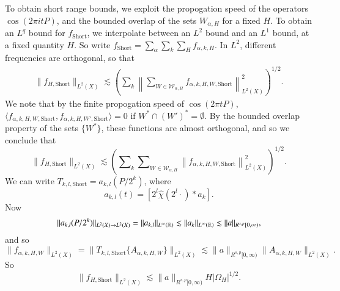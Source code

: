 To obtain short range bounds, we exploit the propogation speed of the operators $\cos(2 \pi i t P)$, and the bounded overlap of the sets $W_{\alpha,H}$ for a fixed $H$. To obtain an $L^q$ bound for $f_{\text{Short}}$, we interpolate between an $L^2$ bound and an $L^1$ bound, at a fixed quantity $H$. So write $f_{\text{Short}} = \sum_\alpha \sum_k \sum_H f_{\alpha,k,H}$.
%
In $L^2$, different frequencies are orthogonal, so that
%
\begin{equation}
\begin{split}
    \| f_{H,\text{Short}} \|_{L^2(X)} \lesssim \left( \sum\nolimits_k \left\| \sum\nolimits_{W \in \mathcal{W}_{\alpha,H}} f_{\alpha,k,H,W,\text{Short}} \right\|_{L^2(X)}^2 \right)^{1/2}.
\end{split}
\end{equation}
%
We note that by the finite propogation speed of $\cos(2 \pi t P)$, $\langle f_{\alpha,k,H,W,\text{Short}}, f_{\alpha,k,H,W',\text{Short}} \rangle = 0$ if $W^* \cap (W')^* = \emptyset$. By the bounded overlap property of the sets $\{ W^* \}$, these functions are almost orthogonal, and so we conclude that
%
\begin{equation}
    \| f_{H,\text{Short}} \|_{L^2(X)} \lesssim \left( \sum\nolimits_k \sum\nolimits_{W \in \mathcal{W}_{\alpha,H}} \left\| f_{\alpha,k,H,W,\text{Short}} \right\|_{L^2(X)}^2 \right)^{1/2}.
\end{equation}
%
We can write $T_{k,l,\text{Short}} = a_{k,l}(P / 2^k)$, where
%
\begin{equation}
    a_{k,l}(t) = [2^l \widehat{\chi}(2^l \cdot) * a_k].
\end{equation}
%
Now
%
\begin{equation}
    \| a_{k,l}(P/2^k) \|_{L^2(X) \to L^2(X)} = \| a_{k,l} \|_{L^\infty(\operatorname{\mathbb{R}})} \lesssim \| a_k \|_{L^\infty(\operatorname{\mathbb{R}})} \lesssim \| a \|_{R^{s,p}[0,\infty)}, 
\end{equation}
%
and so
%
\begin{equation}
    \| f_{\alpha,k,H,W} \|_{L^2(X)} = \| T_{k,l,\text{Short}} \{ A_{\alpha,k,H,W} \} \|_{L^2(X)} \lesssim \| a \|_{R^{s,p}[0,\infty)} \| A_{\alpha,k,H,W} \|_{L^2(X)}.
\end{equation}
%
So
%
\begin{equation}
    \| f_{H,\text{Short}} \|_{L^2(X)} \lesssim \| a \|_{R^{s,p}[0,\infty)} H |\Omega_H|^{1/2}.
\end{equation}
